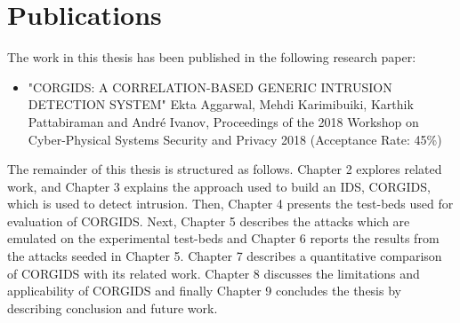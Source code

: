 \section {Publications}
The work in this thesis has been published in the following research paper:
\begin{itemize}
\item "CORGIDS: A CORRELATION-BASED GENERIC INTRUSION DETECTION SYSTEM" Ekta Aggarwal, Mehdi Karimibuiki, Karthik Pattabiraman and Andr\'e Ivanov, Proceedings of the 2018 Workshop on Cyber-Physical Systems Security and Privacy 2018 (Acceptance Rate: 45\%)
\end{itemize}

The remainder of this thesis is structured as follows. Chapter 2 explores related work, and Chapter 3 explains the approach used to build an \ac{IDS}, \ac{CORGIDS}, which is used  to detect intrusion. Then, Chapter 4 presents the test-beds used for evaluation of \ac{CORGIDS}. Next, Chapter 5 describes the attacks which are emulated on the experimental test-beds and Chapter 6 reports the results from the attacks seeded in Chapter 5. Chapter 7 describes a quantitative comparison of \ac{CORGIDS} with its related work. Chapter 8  discusses the limitations and applicability of \ac{CORGIDS} and finally Chapter 9 concludes the thesis by describing conclusion and future work.

\endinput
